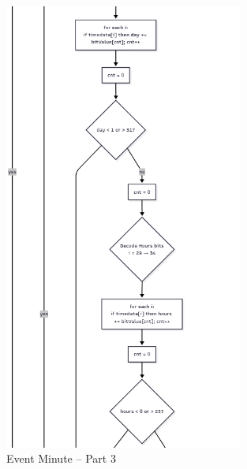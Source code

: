\documentclass[a4paper,12pt]{article}
\begin{document}
\begin{figure}[H]
    \centering
    \includegraphics[width=0.7\textwidth]{diagrams/eventMinute/eventMinute3.png}
    \caption{Event Minute – Part 3}
    \label{fig:eventMinute3}
\end{figure}
\end{document}
